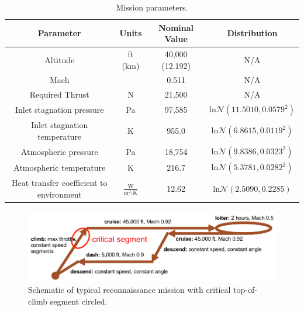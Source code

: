 \documentclass{article}
\begin{document}
\begin{table}
\caption[Mission parameters]{Mission parameters.}
\label{tab:missionParams}
\begin{center}
\begin{tabular}[]{ c | c | c | c }
\textbf{Parameter} & \textbf{Units} & \textbf{Nominal Value} & \textbf{Distribution} \\ \hline
Altitude & ft (km) & 40,000 (12.192) & N/A \\ \hline
Mach & & 0.511 & N/A \\ \hline
Required Thrust & N & 21,500 & N/A \\ \hline
Inlet stagnation pressure & Pa & 97,585 & $\textrm{ln}\mathcal{N}(11.5010, 0.0579^2)$ \\ \hline
Inlet stagnation temperature & K & 955.0 & $\textrm{ln}\mathcal{N}(6.8615, 0.0119^2)$ \\ \hline
Atmospheric pressure & Pa & 18,754 & $\textrm{ln}\mathcal{N}(9.8386,0.0323^2)$ \\ \hline
Atmospheric temperature & K & 216.7 & $\textrm{ln}\mathcal{N}(5.3781,0.0282^2)$ \\ \hline
Heat transfer coefficient to environment & $\frac{\textrm{W}}{\textrm{m}^2\textrm{-K}}$ & 12.62 & $\textrm{ln}\mathcal{N}(2.5090,0.2285)$ \\ \hline
\end{tabular}
\end{center}
\end{table}

\begin{figure}
\caption{Schematic of typical reconnaissance mission with critical top-of-climb segment circled.}
\label{fig:missionSchematic}
\begin{center}
\includegraphics[scale=0.4]{figs/mission_profile.png}
\end{center}
\end{figure}
\end{document}
